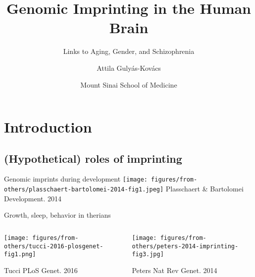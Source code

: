 \documentclass{beamer}
\title{Genomic Imprinting in the Human Brain}
\subtitle{Links to Aging, Gender, and Schizophrenia}
\author{Attila Guly\'{a}s-Kov\'{a}cs}
\date{Mount Sinai School of Medicine}
\begin{document}
\maketitle

\section{Introduction}
\subsection{(Hypothetical) roles of imprinting}

\begin{frame}{Genomic imprints during development}
\texttt{[image: figures/from-others/plasschaert-bartolomei-2014-fig1.jpeg]}
\vfill
{\tiny Plasschaert \& Bartolomei Development. 2014}
\end{frame}

\begin{frame}{Growth, sleep, behavior in therians}
\begin{columns}[t]
\begin{column}{0.4\textwidth}

\texttt{[image: figures/from-others/tucci-2016-plosgenet-fig1.png]}

{\tiny Tucci PLoS Genet. 2016}
\end{column}

\begin{column}{0.6\textwidth}

\texttt{[image: figures/from-others/peters-2014-imprinting-fig3.jpg]}

{\tiny Peters Nat Rev Genet. 2014}
\end{column}
\end{columns}
\end{frame}
\end{document}
